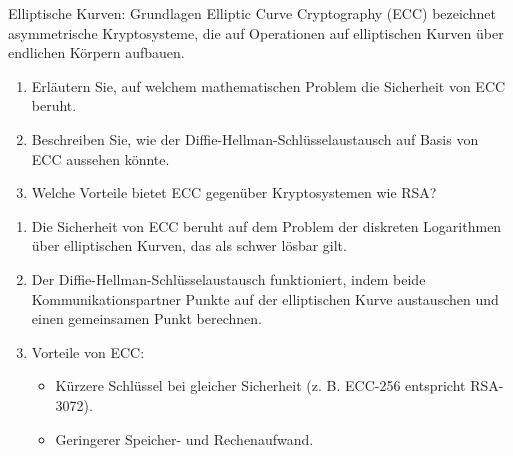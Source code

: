 \documentclass{article}
\begin{document}
\begin{exercise}{Elliptische Kurven: Grundlagen}
  Elliptic Curve Cryptography (ECC) bezeichnet asymmetrische Kryptosysteme, die auf Operationen auf elliptischen Kurven über endlichen Körpern aufbauen.
  \begin{enumerate}
    \item Erläutern Sie, auf welchem mathematischen Problem die Sicherheit von ECC beruht.
    \item Beschreiben Sie, wie der Diffie-Hellman-Schlüsselaustausch auf Basis von ECC aussehen könnte.
    \item Welche Vorteile bietet ECC gegenüber Kryptosystemen wie RSA?
  \end{enumerate}

  \begin{solution}
    \begin{enumerate}
        \item Die Sicherheit von ECC beruht auf dem Problem der diskreten Logarithmen über elliptischen Kurven, das als schwer lösbar gilt.
        \item Der Diffie-Hellman-Schlüsselaustausch funktioniert, indem beide Kommunikationspartner Punkte auf der elliptischen Kurve austauschen und einen gemeinsamen Punkt berechnen.
        \item Vorteile von ECC:
        \begin{itemize}
            \item Kürzere Schlüssel bei gleicher Sicherheit (z. B. ECC-256 entspricht RSA-3072).
            \item Geringerer Speicher- und Rechenaufwand.
        \end{itemize}
    \end{enumerate}
  \end{solution}
\end{exercise}
\end{document}
